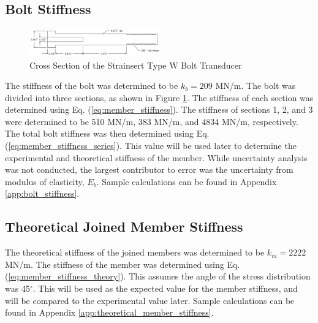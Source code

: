 \subsection{Bolt Stiffness}
\begin{figure}[h]
    \centering
    \includegraphics[width=0.5\textwidth]{Sections/Figures/bolt member drawing.png}
    \caption{Cross Section of the Strainsert Type W Bolt Transducer}
    \label{fig:bolt_member_drawing}
\end{figure}
The stiffness of the bolt was determined to be $k_b = 209$ MN/m. The bolt was divided into three sections, as shown in Figure \ref{fig:bolt_member_drawing}. The stiffness of each section was determined using Eq. (\ref{eq:member_stiffness}). The stiffness of sections 1, 2, and 3 were determined to be 510 MN/m, 383 MN/m, and 4834 MN/m, respectively. The total bolt stiffness was then determined using Eq. (\ref{eq:member_stiffness_series}). This value will be used later to determine the experimental and theoretical stiffness of the member. While uncertainty analysis was not conducted, the largest contributor to error was the uncertainty from modulus of elasticity, $E_b$. Sample calculations can be found in Appendix \ref{app:bolt_stiffness}.

\subsection{Theoretical Joined Member Stiffness}
The theoretical stiffness of the joined members was determined to be $k_m = 2222$ MN/m. The stiffness of the member was determined using Eq. (\ref{eq:member_stiffness_theory}). This assumes the angle of the stress distribution was 45$^\circ$. This will be used as the expected value for the member stiffness, and will be compared to the experimental value later. Sample calculations can be found in Appendix \ref{app:theoretical_member_stiffness}.


